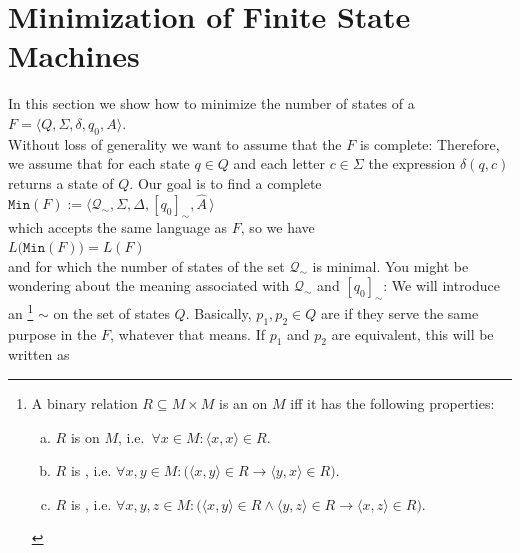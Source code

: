\section{Minimization of Finite State Machines}
In this section we show how to minimize the number of states of a 
\\[0.2cm]
\hspace*{1.3cm}
$F = \langle Q, \Sigma, \delta, q_0, A \rangle$.
\\[0.2cm]
Without loss of generality we want to assume that the  $F$ is complete: Therefore, we assume that
for each state $q \in Q$ and each letter $c \in \Sigma$ the expression $\delta(q, c)$ 
returns a state of $Q$.  Our goal is to find a complete 
\\[0.2cm]
\hspace*{1.3cm}
$\mathtt{Min}(F) := \bigl\langle \mathcal{Q}_\sim, \Sigma, \Delta, [q_0]_\sim, \widehat{A} \,\bigr\rangle$
\\[0.2cm]
which accepts the same language as  $F$, so we have 
\\[0.2cm]
\hspace*{1.3cm}
$L\bigl(\mathtt{Min}(F)\bigr) = L(F)$
\\[0.2cm]
and for which the number of states of the set $\mathcal{Q}_\sim$ is minimal.  You might be wondering about the
meaning associated with $\mathcal{Q}_\sim$ and $[q_0]_\sim$:  We will introduce an \footnote{A binary relation $R \subseteq M \times M$ is an  on $M$ iff it has the
  following properties:
  \begin{enumerate}[(a)]
  \item $R$ is  on $M$, i.e.~$\forall x\in M: \langle x, x\rangle \in R$.
  \item $R$ is , i.e.
    $\forall x,y\in M:\bigl(\langle x, y\rangle \in R \rightarrow \langle y, x\rangle\in R\bigr)$.
  \item $R$ is , i.e. $\forall x,y,z \in M:\bigl(\langle x, y\rangle \in R \wedge \langle
    y, z\rangle \in R \rightarrow \langle x, z\rangle \in R\bigr)$.
  \end{enumerate}}
$\sim$ on the set of states $Q$.  Basically, $p_1, p_2\in Q$ are  if they serve the same
purpose in the  $F$, whatever that means.  If $p_1$ and $p_2$ are equivalent, this will be written as
\\[0.2cm]
\hspace*{1.3cm}
